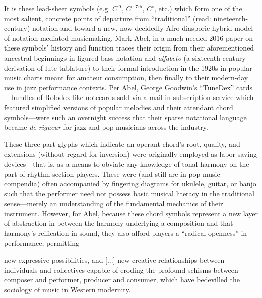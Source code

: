     It is these lead-sheet symbols (e.g. $C^{\Delta}$, $C^{-7\flat5}$, $C^{\circ}$, etc.) which form one of the most salient, concrete points of departure from ``traditional'' (read: nineteenth-century) notation and toward a new, now decidedly Afro-diasporic hybrid model of notation-mediated musicmaking. Mark Abel, in a much-needed 2016 paper on these symbols' history and function traces their origin from their aforementioned ancestral beginnings in figured-bass notation and \textit{alfabeto} (a sixteenth-century derivation of lute tablature) to their formal introduction in the 1920s in popular music charts meant for amateur consumption, then finally to their modern-day use in jazz performance contexts. Per Abel, George Goodwin's ``TuneDex'' cards---bundles of Rolodex-like notecards sold via a mail-in subscription service which featured simplified versions of popular melodies and their attendant chord symbols---were such an overnight success that their sparse notational language became \textit{de rigueur} for jazz and pop musicians across the industry.\autocite[28]{Abel_2016}
    
    These three-part glyphs which indicate an operant chord's root, quality, and extensions (without regard for inversion) were originally employed as labor-saving devices---that is, as a means to obviate any knowledge of tonal harmony on the part of rhythm section players. These were (and still are in pop music compendia) often  accompanied by fingering diagrams for ukulele, guitar, or banjo such that the performer need not possess basic musical literacy in the traditional sense---merely an understanding of the fundamental mechanics of their instrument. However, for Abel, because these chord symbols represent a new layer of abstraction in between the harmony underlying a composition and that harmony's reification in sound, they also afford players a ``radical openness'' in performance, permitting 
    
        \begin{smallquote}
            new expressive possibilities, and [...] new creative relationships between individuals and collectives capable of eroding the profound schisms between composer and performer, producer and consumer, which have bedevilled the sociology of music in Western modernity.\autocite{Abel_2016}
        \end{smallquote}

